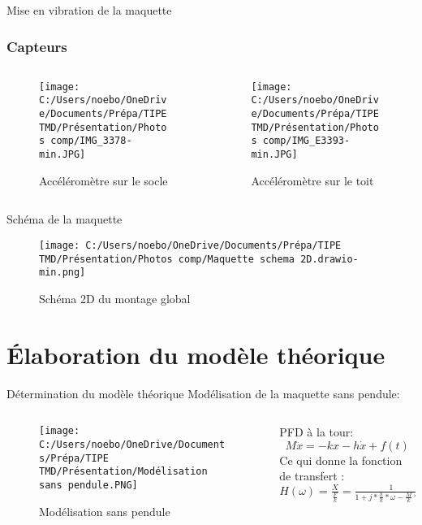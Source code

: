 \documentclass{beamer}
\begin{document}
	\begin{frame}{Mise en vibration de la maquette}
	
	\frametitle{Capteurs}
	\begin{columns}
		\begin{column}{0.25\textwidth}
			\begin{figure}
				\texttt{[image: C:/Users/noebo/OneDrive/Documents/Prépa/TIPE TMD/Présentation/Photos comp/IMG\_3378-min.JPG]}
				\caption{Accéléromètre sur le socle}
			\end{figure}
		\end{column}
		\begin{column}{0.5\textwidth}
			\begin{figure}
				\texttt{[image: C:/Users/noebo/OneDrive/Documents/Prépa/TIPE TMD/Présentation/Photos comp/IMG\_E3393-min.JPG]}
				\caption{Accéléromètre sur le toit}
			\end{figure}
		\end{column}
	\end{columns}
\end{frame}

\begin{frame}{Schéma de la maquette}
	\begin{figure}
		\texttt{[image: C:/Users/noebo/OneDrive/Documents/Prépa/TIPE TMD/Présentation/Photos comp/Maquette schema 2D.drawio-min.png]}
		\caption{Schéma 2D du montage global}
	\end{figure}
\end{frame}
	
\section{Élaboration du modèle théorique}

\begin{frame}{Détermination du modèle théorique}
 Modélisation de la maquette sans pendule:\vspace{12 pt}
	\begin{columns}
		\begin{column}{0.5\textwidth}
			\begin{figure}
				\texttt{[image: C:/Users/noebo/OneDrive/Documents/Prépa/TIPE TMD/Présentation/Modélisation sans pendule.PNG]}
				\caption{Modélisation sans pendule}
			\end{figure}
		\end{column}
		\begin{column}{0.6\textwidth}
			PFD à la tour:
			\begin{equation*}
				M\ddot{x} = -kx -h\dot{x} + f(t)
			\end{equation*}
			Ce qui donne la fonction de transfert : 
			$H(\omega)=\frac{X}{\frac{F}{k}}=\frac{1}{1+j*\frac{h}{k}*\omega-\frac{M}{k}*\omega^{2}}$
		\end{column}
	\end{columns}
\end{frame}	
\end{document}
